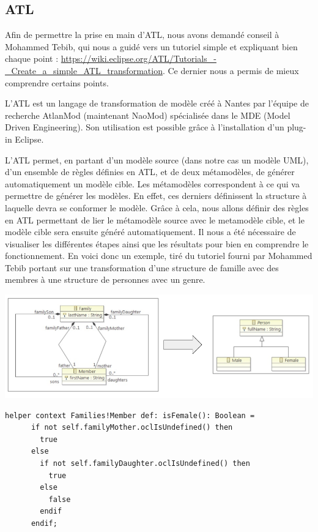 \documentclass[french, 12pt, a4paper]{article}
\begin{document}
\subsection{ATL}
Afin de permettre la prise en main d'ATL, nous avons demandé conseil à Mohammed Tebib, qui nous a guidé vers un tutoriel simple et expliquant bien chaque point : \url{https://wiki.eclipse.org/ATL/Tutorials_-_Create_a_simple_ATL_transformation}. Ce dernier nous a permis de mieux comprendre certains points.

L'ATL est un langage de transformation de modèle créé à Nantes par l'équipe de recherche AtlanMod (maintenant NaoMod) spécialisée dans le MDE (Model Driven Engineering). Son utilisation est possible grâce à l'installation d'un plug-in Eclipse. 

L'ATL permet, en partant d'un modèle source (dans notre cas un modèle UML), d'un ensemble de règles définies en ATL, et de deux métamodèles, de générer automatiquement un modèle cible. Les métamodèles correspondent à ce qui va permettre de générer les modèles. En effet, ces derniers définissent la structure à laquelle devra se conformer le modèle. Grâce à cela, nous allons définir des règles en ATL permettant de lier le métamodèle source avec le metamodèle cible, et le modèle cible sera ensuite généré automatiquement. Il nous a été nécessaire de visualiser les différentes étapes ainsi que les résultats pour bien en comprendre le fonctionnement. En voici donc un exemple, tiré du tutoriel fourni par Mohammed Tebib portant sur une transformation d'une structure de famille avec des membres à une structure de personnes avec un genre.
    
	\begin{center}
				\captionsetup{type=figure}
				\includegraphics[scale=0.55]{Images/UML.png}
	\end{center}
    
    
	\begin{lstlisting}[caption={Un helper défini en ATL, permettant ensuite le définition des règles. Ici, le helper regarde si le membre de la famille est une fille ou non.}]
    helper context Families!Member def: isFemale(): Boolean =
      if not self.familyMother.oclIsUndefined() then
        true
	  else
        if not self.familyDaughter.oclIsUndefined() then
          true
        else
          false
        endif
      endif;
	\end{lstlisting}
	
\end{document}
